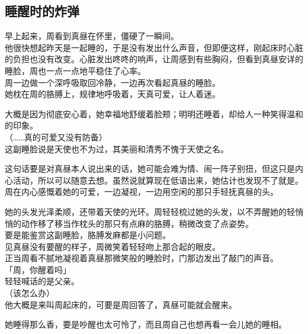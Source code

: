 \subsection{睡醒时的炸弹}

早上起来，周看到真昼在怀里，僵硬了一瞬间。\\

他很快想起昨天是一起睡的，于是没有发出什么声音，但即便这样，刚起床时心脏的负担也没有改变。心脏发出咚咚的响声，让周感到有些胸闷，但看到真昼安详的睡脸，周也一点一点地平稳住了心率。\\

周一边做一个深呼吸取回冷静，一边再次看起真昼的睡脸。\\

她枕在周的胳膊上，规律地呼吸着，天真可爱，让人着迷。

大概是因为彻底安心着，她幸福地舒缓着脸颊；明明还睡着，却给人一种笑得温和的印象。\\

（……真的可爱又没有防备）\\

这副睡脸说是天使也不为过，其美丽和清秀不愧于天使之名。

这句话要是对真昼本人说出来的话，她可能会难为情、闹一阵子别扭，但这只是内心活动，所以可以随意去想。虽然说就算现在低语出来，她估计也发现不了就是。\\

周在内心感慨着她的可爱，一边凝视，一边用空闲的那只手轻抚真昼的头。

她的头发光泽柔顺，还带着天使的光环。周轻轻梳过她的头发，以不弄醒她的轻悄悄的动作移了移当作枕头的那只有点麻的胳膊，稍微改变了点姿势。\\

要是能鉴赏这副睡脸，胳膊发麻都是小问题。\\

见真昼没有要醒的样子，周微笑着轻轻吻上那合起的眼皮。\\

正当周看不腻地凝视着真昼那微笑般的睡脸时，门那边发出了敲门的声音。\\

「周，你醒着吗」\\

轻轻喊话的是父亲。\\

（该怎么办）\\

他大概是来叫周起床的，可要是周回答了，真昼可能就会醒来。

她睡得那么香，要是吵醒也太可怜了，而且周自己也想再看一会儿她的睡相。\\

